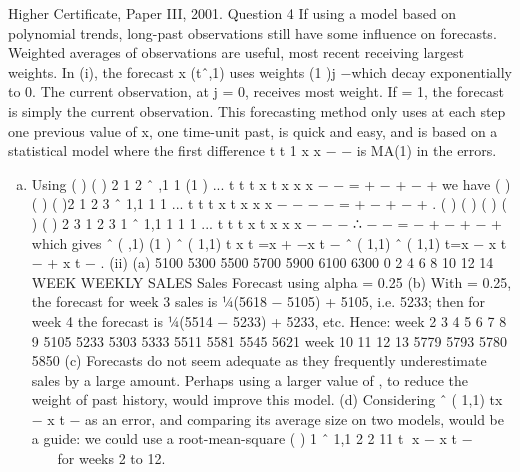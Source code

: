 \documentclass[a4paper,12pt]{article}
\begin{document}

Higher Certificate, Paper III, 2001. Question 4
If using a model based on polynomial trends, long-past observations still have some
influence on forecasts. Weighted averages of observations are useful, most recent
receiving largest weights. In (i), the forecast x (tˆ,1) uses weights (1 )j \alpha  −\alpha  which
decay exponentially to 0. The current observation, at j = 0, receives most weight. If
\alpha  = 1, the forecast is simply the current observation. This forecasting method only
uses at each step one previous value of x, one time-unit past, is quick and easy, and is
based on a statistical model where the first difference t t 1 x x − − is MA(1) in the errors.
\begin{enumerate}[(a)]
\item  Using ( ) ( ) 2
1 2 ˆ ,1 1 (1 ) ... t t t x t \alpha  x \alpha  \alpha  x \alpha  \alpha  x − − = + − + − +
we have
( ) ( ) ( )2
1 2 3 ˆ 1,1 1 1 ... t t t x t \alpha  x \alpha  \alpha  x \alpha  \alpha  x − − − − = + − + − + .
( ) ( ) ( ) ( ) ( ) 2 3
1 2 3 1 ˆ 1,1 1 1 1 ... t t t \alpha  x t \alpha  \alpha  x \alpha  \alpha  x \alpha  \alpha  x − − − ∴ − − = − + − + − +
which gives
ˆ ( ,1) (1 ) ˆ ( 1,1) t x t =\alpha  x + −\alpha  x t −
{ ˆ ( 1,1)} ˆ ( 1,1) t=\alpha  x − x t − + x t − .
(ii) (a)
5100
5300
5500
5700
5900
6100
6300
0 2 4 6 8 10 12 14
WEEK
WEEKLY SALES
Sales
Forecast using
alpha = 0.25
(b) With \alpha  = 0.25, the forecast for week 3 sales is ¼(5618 − 5105) + 5105,
i.e. 5233; then for week 4 the forecast is ¼(5514 − 5233) + 5233, etc. Hence:
week 2 3 4 5 6 7 8 9
5105 5233 5303 5333 5511 5581 5545 5621
week 10 11 12 13
5779 5793 5780 5850
(c) Forecasts do not seem adequate as they frequently underestimate sales
by a large amount. Perhaps using a larger value of \alpha , to reduce the weight of
past history, would improve this model.
(d) Considering ˆ ( 1,1) tx − x t − as an error, and comparing its average size
on two models, would be a guide: we could use a root-mean-square
{ ( )}
1
ˆ 1,1 2 2
11
t x − x t − 
 
 
 
\sigma for weeks 2 to 12.
\end{enumerate}
\end{document}

